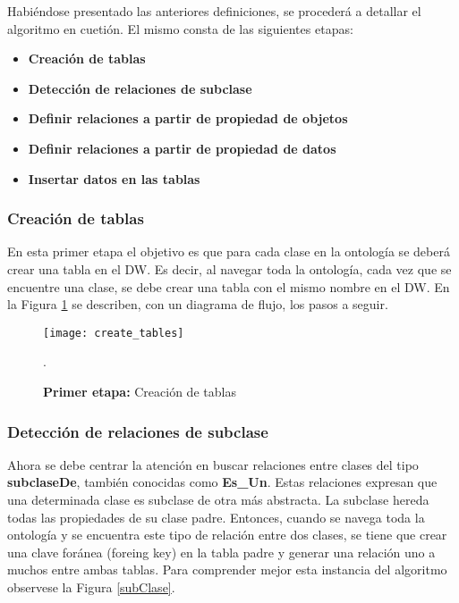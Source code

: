 \documentclass[a4paper,11pt]{article}
\begin{document}
    
    Habiéndose presentado las anteriores definiciones, se procederá a detallar el algoritmo en cuetión. El mismo consta de las siguientes etapas:
    
    \begin{itemize}
      \item \textbf{Creación de tablas}
      \item \textbf{Detección de relaciones de subclase}
      \item \textbf{Definir relaciones a partir de propiedad de objetos}
      \item \textbf{Definir relaciones a partir de propiedad de datos}
      \item \textbf{Insertar datos en las tablas}
    \end{itemize} 
    
    \subsubsection{Creación de tablas}
    
    En esta primer etapa el objetivo es que para cada clase en la ontología se deberá crear una tabla en el DW. Es decir, al navegar toda la ontología,
    cada vez que se encuentre una clase, se debe crear una tabla con el mismo nombre en el DW. En la Figura \ref{createTables} se describen, con un
    diagrama de flujo, los pasos a seguir.
    
    \begin{figure}
      \begin{center}
        \texttt{[image: create\_tables]}
        \caption{\textbf{Primer etapa:} Creación de tablas} \cite[p.~20]{ontologias}.
        \label{createTables}
      \end{center}
    \end{figure}
    
    \subsubsection{Detección de relaciones de subclase}
     
    Ahora se debe centrar la atención en buscar relaciones entre clases del tipo \textbf{subclaseDe}, también conocidas como \textbf{Es\_Un}. Estas
    relaciones expresan que una determinada clase es subclase de otra más abstracta. La subclase hereda todas las propiedades de su clase padre.
    Entonces, cuando se navega toda la ontología y se encuentra este tipo de relación entre dos clases, se tiene que crear una clave foránea (foreing
    key) en la tabla padre y generar una relación uno a muchos entre ambas tablas. Para comprender mejor esta instancia del algoritmo observese la
    Figura \ref{subClase}.
   
\end{document}

